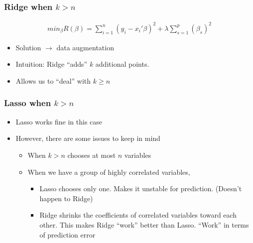 \documentclass[
  shownotes,
  xcolor={svgnames},
  hyperref={colorlinks,citecolor=DarkBlue,linkcolor=DarkRed,urlcolor=DarkBlue}
  , aspectratio=169]{beamer}
\begin{document}
\begin{frame}[fragile]
\frametitle{Ridge when $k>n$}

\begin{align}
min_{\beta} R(\beta) = \sum_{i=1}^n (y_i-x_i'\beta)^2 + \lambda \sum_{s=1}^p (\beta_s)^2
\end{align}

\bigskip
\begin{itemize}
  \item Solution $\rightarrow$ data augmentation
  \medskip
  \item Intuition: Ridge ``adds'' $k$ additional points.
  \medskip
  \item Allows us to ``deal'' with $k\geq n$
\end{itemize}

\end{frame}
\begin{frame}[fragile]
\frametitle{Lasso when $k>n$}

\begin{itemize}
  \item Lasso works fine in this case
  \medskip
  \item However, there are some issues to keep in mind
  \begin{itemize}
    \medskip
  \item When $k>n$ chooses at most $n$ variables
  \medskip
  \item When we have a group of highly correlated variables, 
  \medskip
    \begin{itemize}
      \item Lasso chooses only one. Makes it unstable for prediction. (Doesn't happen to Ridge)
      \medskip
      \item Ridge shrinks the coefficients of correlated variables toward each other. This makes Ridge ``work'' better than Lasso. ``Work'' in terms of prediction error
    \end{itemize}
  \end{itemize}  
  \medskip
  
\end{itemize}



\end{frame}

\end{document}
